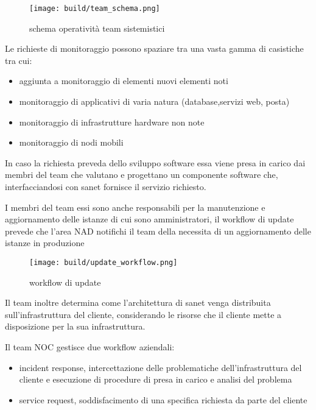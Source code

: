 \begin{figure}[H]
    \centering
    \texttt{[image: build/team\_schema.png]}
    \caption{schema operatività team sistemistici}
    \label{fig:enter-label}
\end{figure}

Le richieste di monitoraggio possono spaziare tra una vasta gamma di casistiche tra cui:

\begin{itemize}
  \item{aggiunta a monitoraggio di elementi nuovi elementi noti}
  \item{monitoraggio di applicativi di varia natura (database,servizi web, posta)}
  \item{monitoraggio di infrastrutture hardware non note}
  \item{monitoraggio di nodi mobili}
\end{itemize}

In caso la richiesta preveda dello sviluppo software essa viene presa in carico dai membri del team che valutano e progettano un componente software che, interfacciandosi con sanet fornisce il servizio richiesto.

I membri del team essi sono anche responsabili per la manutenzione e aggiornamento delle istanze di cui sono amministratori, il workflow di update prevede che l'area NAD notifichi il team della necessita di un aggiornamento delle istanze in produzione


\begin{figure}[H]
    \centering
    \texttt{[image: build/update\_workflow.png]}
    \caption{workflow di update}
    \label{fig:enter-label}
\end{figure}

Il team inoltre determina come l'architettura di sanet venga distribuita sull'infrastruttura del cliente, considerando le risorse che il cliente mette a disposizione per la sua infrastruttura.


Il team NOC gestisce due workflow aziendali:

\begin{itemize}
  \item{incident response, intercettazione delle problematiche dell'infrastruttura del cliente e esecuzione di procedure di presa in carico e analisi del problema}
  \item{service request, soddisfacimento di una specifica richiesta da parte del cliente}
\end{itemize}


